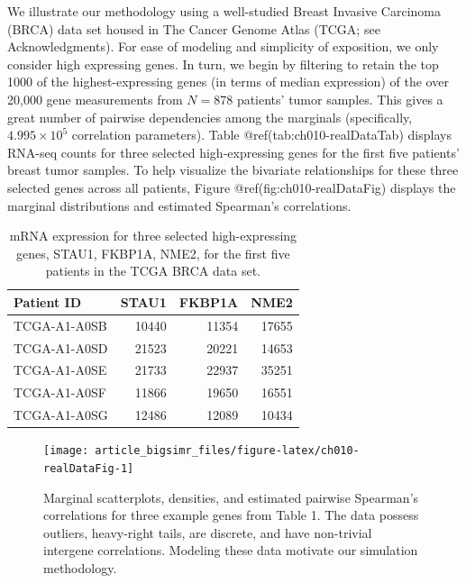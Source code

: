 \documentclass[
]{jss}
\begin{document}
We illustrate our methodology using a well-studied Breast Invasive
Carcinoma (BRCA) data set housed in The Cancer Genome Atlas (TCGA; see
Acknowledgments). For ease of modeling and simplicity of exposition, we
only consider high expressing genes. In turn, we begin by filtering to
retain the top 1000 of the highest-expressing genes (in terms of median
expression) of the over 20,000 gene measurements from \(N=878\)
patients' tumor samples. This gives a great number of pairwise
dependencies among the marginals (specifically,
\(\ensuremath{4.995\times 10^{5}}\) correlation parameters). Table
@ref(tab:ch010-realDataTab) displays RNA-seq counts for three selected
high-expressing genes for the first five patients' breast tumor samples.
To help visualize the bivariate relationships for these three selected
genes across all patients, Figure @ref(fig:ch010-realDataFig) displays
the marginal distributions and estimated Spearman's correlations.

\begin{CodeChunk}
\begin{table}

\caption{\label{tab:ch010-realDataTab}mRNA expression for three selected high-expressing genes, STAU1, FKBP1A, NME2, for the first five patients in the TCGA BRCA data set.}
\centering
\begin{tabular}[t]{lrrr}
\toprule
Patient ID & STAU1 & FKBP1A & NME2\\
\midrule
TCGA-A1-A0SB & 10440 & 11354 & 17655\\
TCGA-A1-A0SD & 21523 & 20221 & 14653\\
TCGA-A1-A0SE & 21733 & 22937 & 35251\\
TCGA-A1-A0SF & 11866 & 19650 & 16551\\
TCGA-A1-A0SG & 12486 & 12089 & 10434\\
\bottomrule
\end{tabular}
\end{table}

\end{CodeChunk}

\begin{CodeChunk}
\begin{figure}

{\centering \texttt{[image: article\_bigsimr\_files/figure-latex/ch010-realDataFig-1]} 

}

\caption[Marginal scatterplots, densities, and estimated pairwise Spearman's correlations for three example genes from Table 1]{Marginal scatterplots, densities, and estimated pairwise Spearman's correlations for three example genes from Table 1. The data possess outliers, heavy-right tails, are discrete, and have non-trivial intergene correlations. Modeling these data motivate our simulation methodology.}\label{fig:ch010-realDataFig}
\end{figure}
\end{CodeChunk}
\end{document}
